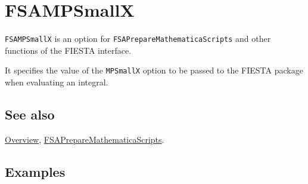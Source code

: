 \documentclass[../FeynHelpersManual.tex]{subfiles}
\begin{document}
\begin{Shaded}
\begin{Highlighting}[]
 
\end{Highlighting}
\end{Shaded}

\hypertarget{fsampsmallx}{
\section{FSAMPSmallX}\label{fsampsmallx}}

\texttt{FSAMPSmallX} is an option for
\texttt{FSAPrepareMathematicaScripts} and other functions of the FIESTA
interface.

It specifies the value of the \texttt{MPSmallX} option to be passed to
the FIESTA package when evaluating an integral.

\subsection{See also}

\hyperlink{toc}{Overview},
\hyperlink{fsapreparemathematicascripts}{FSAPrepareMathematicaScripts}.

\subsection{Examples}
\end{document}
